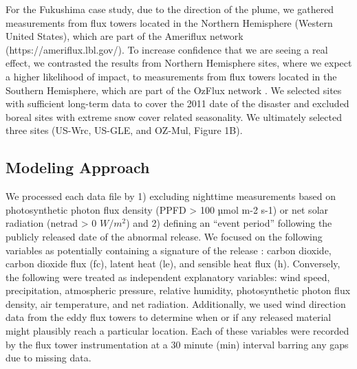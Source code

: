 \documentclass{article}
\begin{document}
For the Fukushima case study, due to the direction of the plume, we gathered measurements from flux towers located in the Northern Hemisphere (Western United States), which are part of the Ameriflux network (https://ameriflux.lbl.gov/). To increase confidence that we are seeing a real effect, we contrasted the results from Northern Hemisphere sites, where we expect a higher likelihood of impact, to measurements from flux towers located in the Southern Hemisphere, which are part of the OzFlux network \citep{cleverly2011alice}. We selected sites with sufficient long-term data to cover the 2011 date of the disaster and excluded boreal sites with extreme snow cover related seasonality. We ultimately selected three sites (US-Wrc, US-GLE, and OZ-Mul, Figure 1B).

\subsection{Modeling Approach}
We processed each data file by 1) excluding nighttime measurements based on photosynthetic photon flux density (PPFD > 100 µmol m-2 s-1) or net solar radiation (netrad > 0 $W/m^2$) and 2) defining an “event period” following the publicly released date of the abnormal release. We focused on the following variables as potentially containing a signature of the release : carbon dioxide, carbon dioxide flux (fc), latent heat (le), and sensible heat flux (h). Conversely, the following were treated as independent explanatory variables: wind speed, precipitation, atmospheric pressure, relative humidity, photosynthetic photon flux density, air temperature, and net radiation. Additionally, we used wind direction data from the eddy flux towers to determine when or if any released material might plausibly reach a particular location. Each of these variables were recorded by the flux tower instrumentation at a 30 minute (min) interval barring any gaps due to missing data.
\end{document}

